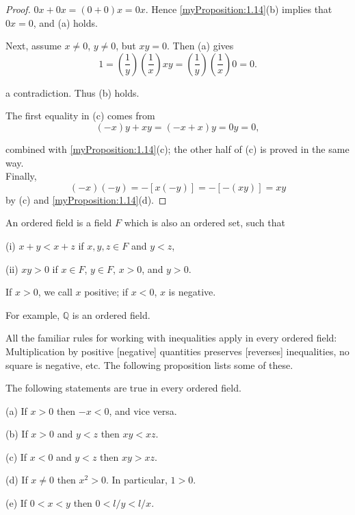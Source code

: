 \begin{proof}
    $0x+0x=(0+0)x=0x$. Hence \ref{myProposition:1.14}(b) implies that $0x=0$, and (a) holds.

    Next, assume $x \neq 0$, $y \neq 0$, but $xy =0$. Then (a) gives
    \begin{equation*}
        1=
        \left(\frac{1}{y}\right)\left(\frac{1}{x}\right)xy=
        \left(\frac{1}{y}\right)\left(\frac{1}{x}\right)0=0.
    \end{equation*}

a contradiction. Thus (b) holds.

The first equality in (c) comes from
\begin{equation*}
    (-x)y +xy=(-x+x)y=0y=0,
\end{equation*}

combined with \ref{myProposition:1.14}(c); the other half of (c) is proved in the same way.\\
Finally,
\begin{equation*}
    (-x)(-y)=-[x(-y)]=-[-(xy)]=xy
\end{equation*}
by (c) and \ref{myProposition:1.14}(d).
\end{proof}

\begin{myDef}\label{myDef:1.17}
    An ordered field is a field $F$ which is also an ordered set, such
    that
    
    (i) $x+y<x+z$ if $x,y,z\in F$ and $y<z$,
    
    (ii) $xy>0$ if $x\in F$, $y\in F$, $x>0$, and $y>0$.
\end{myDef}
If $x > 0$, we call $x$ positive; 
if $x < 0$, $x$ is negative.

For example, $\mathbb{Q}$ is an ordered field.

All the familiar rules for working with inequalities apply in every ordered
field: Multiplication by positive [negative] quantities preserves [reverses] inequalities, no square is negative, etc. The following proposition lists some of
these.


\begin{myProposition}\label{myProposition:1.18}
    The following statements are true in every ordered field.

(a) If $x>0$ then $-x <0$, and vice versa.

(b) If $x>0$ and $y<z$ then $xy <xz$.

(c) If $x<0$ and $y<z$ then $xy> xz$.

(d) If $x \neq 0$ then $x^2 > 0$. In particular, $1 > 0$.

(e) If $0<x<y$ then $0<l/y<l/x$.
\end{myProposition}

